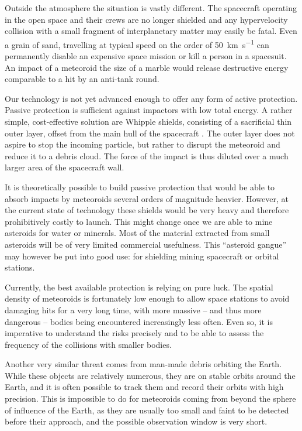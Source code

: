    Outside the atmosphere the situation is vastly different.
    The spacecraft operating in the open space and their crews are no longer shielded
    and any hypervelocity collision with a small fragment of interplanetary matter may easily be fatal.
    Even a grain of sand, travelling at typical speed on the order of \SI{50}{\kilo\metre\per\second} can permanently disable
    an expensive space mission or kill a person in a spacesuit.
    An impact of a meteoroid the size of a marble would release
    destructive energy comparable to a hit by an anti-tank round.

    Our technology is not yet advanced enough to offer any form of active protection.
    Passive protection is sufficient against impactors with low total energy.
    A rather simple, cost-effective solution are Whipple shields, consisting of a sacrificial thin outer layer,
    offset from the main hull of the spacecraft \citep{nasa-shield}.
    The outer layer does not aspire to stop the incoming particle,
    but rather to disrupt the meteoroid and reduce it to a debris cloud.
    The force of the impact is thus diluted over a much larger area of the spacecraft wall.

    It is theoretically possible to build passive protection that would be able to absorb impacts
    by meteoroids several orders of magnitude heavier.
    However, at the current state of technology these shields would be very heavy and therefore prohibitively costly to launch.
    This might change once we are able to mine asteroids for water or minerals.
    Most of the material extracted from small asteroids will be of very limited commercial usefulness.
    This ``asteroid gangue'' may however be put into good use: for shielding mining spacecraft or orbital stations.

    Currently, the best available protection is relying on pure luck. The spatial density of meteoroids is
    fortunately low enough to allow space stations to avoid damaging hits for a very long time,
    with more massive -- and thus more dangerous -- bodies being encountered increasingly less often.
    Even so, it is imperative to understand the risks precisely and to be able to assess the frequency
    of the collisions with smaller bodies.

    Another very similar threat comes from man-made debris orbiting the Earth.
    While these objects are relatively numerous, they are on stable orbits around
    the Earth, and it is often possible to track them and record their orbits with high precision.
    This is impossible to do for meteoroids coming from beyond the sphere of influence of the Earth,
    as they are usually too small and faint to be detected before their approach, and the possible
    observation window is very short.


